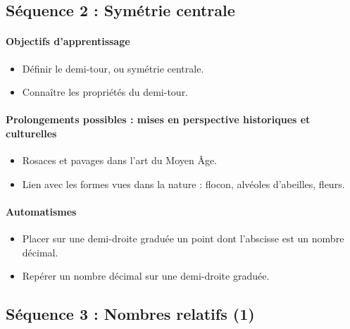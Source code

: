 \documentclass[11pt,a4paper]{article}
\begin{document}
\subsection*{Séquence 2 : Symétrie centrale}

\paragraph{Objectifs d'apprentissage}
\begin{itemize}[label=\bullet]
    \item Définir le demi-tour, ou symétrie centrale.
    \item Connaître les propriétés du demi-tour.
\end{itemize}

\paragraph{Prolongements possibles : mises en perspective historiques et culturelles}
\begin{itemize}[label=\bullet]
    \item Rosaces et pavages dans l'art du Moyen Âge.
    \item Lien avec les formes vues dans la nature : flocon, alvéoles d'abeilles, fleurs.
\end{itemize}

\paragraph{Automatismes}
\begin{itemize}[label=\bullet]
    \item Placer sur une demi-droite graduée un point dont l'abscisse est un nombre décimal.
    \item Repérer un nombre décimal sur une demi-droite graduée.
\end{itemize}


\subsection*{Séquence 3 : Nombres relatifs (1)}
\end{document}
